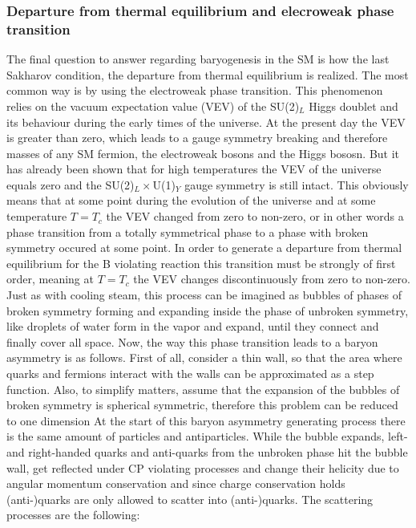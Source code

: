 \subsubsection{Departure from thermal equilibrium and elecroweak phase transition}
 The final question to answer regarding baryogenesis in the SM is how the last Sakharov condition, the departure from thermal equilibrium is realized. The most common way is by using the electroweak phase transition. \newline\indent
This phenomenon relies on the vacuum expectation value (VEV) of the SU(2)$_L$ Higgs doublet and its behaviour during the early times of the universe. At the present day the VEV is greater than zero, which leads to a gauge symmetry breaking and therefore masses of any SM fermion, the electroweak bosons and the Higgs bososn. But it has already been shown \cite[p. 21]{Bernreuther:2002uj} that for high temperatures the VEV of the universe equals zero and the SU(2)$_L\times$U(1)$_Y$ gauge symmetry is still intact. This obviously means that at some point during the evolution of the universe and at some temperature $T=T_c$ the VEV changed from zero to non-zero, or in other words a phase transition from a totally symmetrical phase to a phase with broken symmetry occured at some point. In order to generate a departure from thermal equilibrium for the B violating reaction this transition must be strongly of first order, meaning at $T=T_c$ the VEV changes discontinuously from zero to non-zero. \newline\indent
Just as with cooling steam, this process can be imagined as bubbles of phases of broken symmetry forming and expanding inside the phase of unbroken symmetry, like droplets of water form in the vapor and expand, until they connect and finally cover all space. Now, the way this phase transition leads to a baryon asymmetry is as follows. \newline\indent
First of all, consider a thin wall, so that the area where quarks and fermions interact with the walls can be approximated as a step function. Also, to simplify matters, assume that the expansion of the bubbles of broken symmetry is spherical symmetric, therefore this problem can be reduced to one dimension\cite[p. 33]{Bernreuther:2002uj} \newline\indent
At the start of this baryon asymmetry generating process there is the same amount of particles and antiparticles. \newline\indent
While the bubble expands, left- and right-handed quarks and anti-quarks from the unbroken phase hit the bubble wall, get reflected under CP violating processes and change their helicity due to angular momentum conservation and since charge conservation holds (anti-)quarks are only allowed to scatter into (anti-)quarks. The scattering processes are the following:
